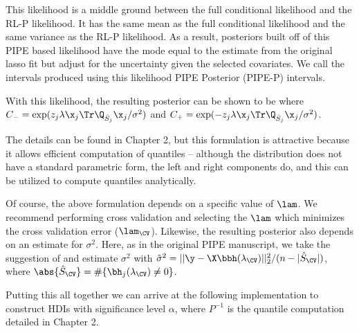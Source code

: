 \noindent This likelihood is a middle ground between the full conditional likelihood and the RL-P likelihood. It has the same mean as the full conditional likelihood and the same variance as the RL-P likelihood. As a result, posteriors built off of this PIPE based likelihood have the mode equal to the estimate from the original lasso fit but adjust for the uncertainty given the selected covariates. We call the intervals produced using this likelihood PIPE Posterior (PIPE-P) intervals.

With this likelihood, the resulting posterior can be shown to be
where $C_{-} = \exp(z_j \lambda \x_j \Tr \Q_{\hat{S}_j} \x_j / \sigma^2)$ and $C_{+} = \exp(-z_j \lambda \x_j \Tr \Q_{\hat{S}_j} \x_j / \sigma^2)$.

The details can be found in Chapter 2, but this formulation is attractive because it allows efficient computation of quantiles -- although the distribution does not have a standard parametric form, the left and right components do, and this can be utilized to compute quantiles analytically.

Of course, the above formulation depends on a specific value of $\lam$. We recommend performing cross validation and selecting the $\lam$ which minimizes the cross validation error ($\lam_{\CV}$). Likewise, the resulting posterior also depends on an estimate for $\sigma^2$. Here, as in the original PIPE manuscript, we take the suggestion of \cite{Reid2016} and estimate $\sigma^2$ with $\hat{\sigma}^2 = ||\y - \X\bbh({\lambda_{\CV}})||_2^2 / (n - |\hat{S}_{\CV}|)$, where $\abs{\hat{S}_{\CV}} = \#\{ \bh_j({\lambda_{\CV}}) \neq 0 \}$.

Putting this all together we can arrive at the following implementation to construct HDIs with significance level $\alpha$, where $P^{-1}$ is the quantile computation detailed in Chapter 2.

